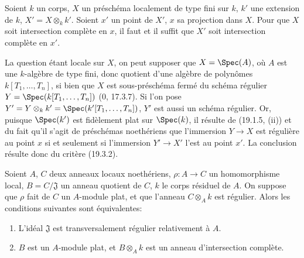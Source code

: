 \begin{corollary}[19.3.4]
\label{IV.19.3.4}
Soient $k$ un corps, $X$ un préschéma localement de type fini sur $k$, $k'$ une extension de $k$, $X'=X\otimes_k k'$. Soient $x'$ un point de $X'$, $x$ sa projection dans $X$. Pour que $X$ soit intersection complète en $x$, il faut et il suffit que $X'$ soit intersection complète en $x'$.
\end{corollary}

La question étant locale sur $X$, on peut supposer que $X=\Spec(A)$, où $A$ est une $k$-algèbre de type fini, donc quotient d'une algèbre de polynômes $k[T_1,\ldots,T_n]$, si bien que $X$ est sous-préschéma fermé du schéma régulier $Y=\Spec(k[T_1,\ldots,T_n])$ ($0$, 17.3.7). Si l'on pose $Y'=Y\otimes_k k'=\Spec(k'[T_1,\ldots,T_n])$, $Y'$ est aussi un schéma régulier. Or, puisque $\Spec(k')$ est fidèlement plat sur $\Spec(k)$, il résulte de (19.1.5, (ii)) et du fait qu'il s'agit de préschémas noethériens que l'immersion $Y\to X$ est régulière au point $x$ si et seulement si l'immersion $Y'\to X'$ l'est au point $x'$. La conclusion résulte donc du critère (19.3.2).

\begin{corollary}[19.3.5]
\label{IV.19.3.5}
Soient $A$, $C$ deux anneaux locaux noethériens, $\rho:A\to C$ un homomorphisme local, $B=C/\mathfrak J$ un anneau quotient de $C$, $k$ le corps résiduel de $A$. On suppose que $\rho$ fait de $C$ un $A$-module plat, et que l'anneau $C\otimes_A k$ est régulier. Alors les conditions suivantes sont équivalentes:
\begin{enumerate}
  \item[a)] L'idéal $\mathfrak J$ est transversalement régulier relativement à $A$.
  \item[b)] $B$ est un $A$-module plat, et $B\otimes_A k$ est un anneau d'intersection complète.
\end{enumerate}
\end{corollary}

